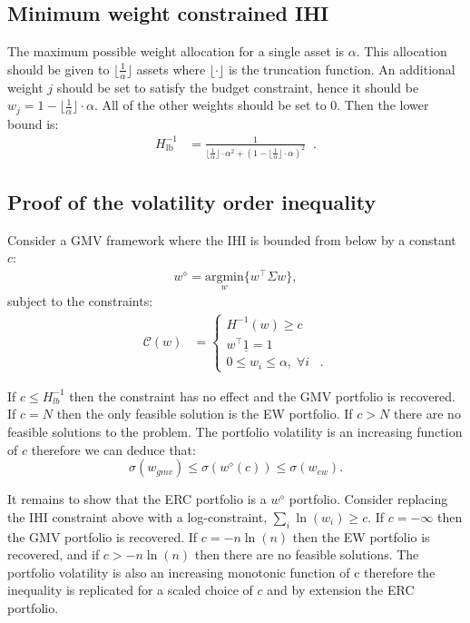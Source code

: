 \documentclass[
]{article}
\begin{document}
\hypertarget{ihimax}{%
\subsection{Minimum weight constrained IHI}\label{ihimax}}

The maximum possible weight allocation for a single asset is \(\alpha\). This allocation should be given
to \(\lfloor \frac{1}{\alpha} \rfloor\) assets where \(\lfloor \cdot \rfloor\) is the truncation function.
An additional weight \(j\) should be set to satisfy the budget constraint, hence it should be
\(w_j = 1 - \lfloor \frac{1}{\alpha} \rfloor \cdot \alpha\). All of the other weights should be set to
0. Then the lower bound is:
\begin{align*}
H_{\text{lb}}^{-1} & = \frac{1}{\lfloor \frac{1}{\alpha} \rfloor \cdot \alpha^2 + (1- \lfloor \frac{1}{\alpha}\rfloor \cdot \alpha)^2} \;\; .
\end{align*}

\hypertarget{volineq}{%
\subsection{Proof of the volatility order inequality}\label{volineq}}

Consider a GMV framework where the IHI is bounded from below by a constant \(c\):
\begin{align*} 
w^\diamond = \underset{w}{\text{argmin}} \Big \{ w^\intercal \Sigma w \Big \},
\end{align*}
subject to the constraints:
\begin{align*}
\mathcal{C}(w) &= 
\begin{cases}
H^{-1}(w) \geq c \\
w^\intercal \underline{1} = 1 \;\; \\
0 \leq w_i \leq \alpha, \; \forall i \;\;\; .
\end{cases}
\end{align*}

If \(c \leq H^{-1}_{lb}\) then the constraint has no effect and the GMV portfolio is recovered. If
\(c = N\) then the only feasible solution is the EW portfolio. If \(c > N\) there are no feasible
solutions to the problem. The portfolio volatility is an increasing function of \(c\) therefore we can
deduce that: \[\sigma(w_{gmv}) \leq \sigma(w^\diamond(c)) \leq \sigma (w_{ew}).\]

It remains to show that the ERC portfolio is a \(w^\diamond\) portfolio. Consider replacing the IHI
constraint above with a log-constraint, \(\sum_i \ln(w_i) \geq c\). If \(c = - \infty\) then the GMV
portfolio is recovered. If \(c = -n \ln(n)\) then the EW portfolio is recovered, and if \(c > -n\ln(n)\)
then there are no feasible solutions. The portfolio volatility is also an increasing monotonic
function of c therefore the inequality is replicated for a scaled choice of \(c\) and by extension the
ERC portfolio.
\end{document}
